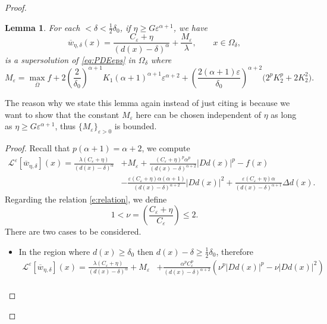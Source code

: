 \documentclass[11pt,reqno]{amsart}
\numberwithin{figure}{section}
\theoremstyle{plain}
\newtheorem{lem}[thm]{Lemma}
\theoremstyle{remark}
\numberwithin{equation}{section}
\begin{document}
\begin{proof}
\begin{lem}\label{lem:subsln} For each $<\delta < \frac{1}{2}\delta_0$, if $\eta\geq G\varepsilon^{\alpha+1}$, we have
\begin{equation*}
    \overline{w}_{\eta,\delta}(x) = \frac{C_\varepsilon+\eta}{(d(x)-\delta)^\alpha} +\frac{M_\varepsilon}{\lambda},\qquad x\in \Omega_\delta, 
\end{equation*}
is a supersolution of \eqref{eq:PDEeps} in $\Omega_\delta$ where
\begin{equation}\label{e:M_eps}
    M_\varepsilon = \max_{\overline{\Omega}} f + 2\left(\frac{2}{\delta_0}\right)^{\alpha+1}K_1(\alpha+1)^{\alpha+1}\varepsilon^{\alpha+2} + \left(\frac{2(\alpha+1)\varepsilon}{\delta_0}\right)^{\alpha+2}\big(2^pK_2^p+2K_2^2\big).
\end{equation}
\end{lem}
\noindent The reason why we state this lemma again instead of just citing \cite{Lasry1989} is because we want to show that the constant $M_\varepsilon$ here can be chosen independent of $\eta$ as long as $\eta \geq G\varepsilon^{\alpha+1}$, thus $\{M_\varepsilon\}_{\varepsilon>0}$ is bounded.
\begin{proof} Recall that $p(\alpha+1) = \alpha+2$, we compute
\begin{align*}
    \mathcal{L}^\varepsilon\left[\overline{w}_{\eta,\delta}\right](x) = \frac{\lambda(C_\varepsilon + \eta)}{(d(x)-\delta)^\alpha} &+ M_\varepsilon + \frac{(C_\varepsilon+\eta)^p \alpha^p}{(d(x)-\delta)^{\alpha+2}}|D d(x)|^p - f(x) \\
    &- \frac{\varepsilon(C_\varepsilon+\eta)\alpha(\alpha+1)}{(d(x)-\delta)^{\alpha+2}}|D d(x)|^2 + \frac{\varepsilon(C_\varepsilon+\eta)\alpha}{(d(x)-\delta)^{\alpha+1}}\Delta d(x).
\end{align*}
Regarding the relation \eqref{e:relation}, we define
\begin{equation*}
    1<\nu = \left(\frac{C_\varepsilon+\eta}{C_\varepsilon}\right) \leq 2.
\end{equation*}
There are two cases to be considered.
\begin{itemize}
    \item In the region where $d(x)\geq \delta_0$ then $d(x)-\delta \geq \frac{1}{2}\delta_0$, therefore 
    \begin{align*}
        \mathcal{L}^\varepsilon\left[\overline{w}_{\eta,\delta}\right](x) = \frac{\lambda(C_\varepsilon + \eta)}{(d(x)-\delta)^\alpha} + M_\varepsilon &+ \frac{\alpha^pC_\varepsilon^p}{(d(x)-\delta)^{\alpha+2}}\left(\nu^{p}|Dd(x)|^p - \nu|Dd(x)|^2\right)\\

\end{align*}
\end{itemize}
\end{proof}
\end{proof}
\end{document}

